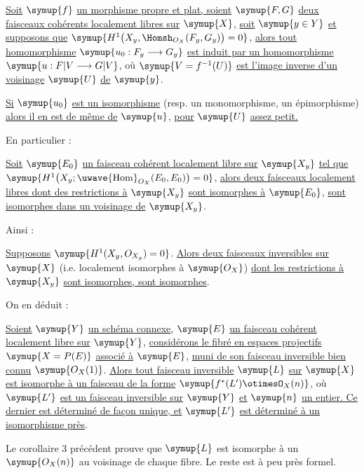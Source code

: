  \uline{Soit} $\symup{f}$ \uline{un morphisme propre et plat, soient} $\symup{F,G}$ \uline{deux
faisceaux cohérents localement libres sur} $\symup{X}$, \uline{soit} $\symup{y\in Y}$ \uline{et supposons que}
$\symup{H^1\bigl(X_y,\Homsh_{O_X}(F_y,G_y)\bigr)=0}$,
\uline{alors tout homomorphisme} $\symup{u_0:F_y\longrightarrow G_y}$ \uline{est induit par un
homomorphisme} $\symup{u:F|V\longrightarrow G|V}$, où $\symup{V=f^{-1}(U)}$ \uline{est l'image inverse d'un voisinage} $\symup{U}$ \uline{de} $\symup{y}$.

 \uline{Si} $\symup{u_0}$ \uline{est un isomorphisme} (resp. un monomorphisme, un
épimorphisme) \uline{alors il en est de même de} $\symup{u}$, \uline{pour} $\symup{U}$ \uline{assez petit.}

En particulier :

 \uline{Soit} $\symup{E_0}$ \uline{un faisceau cohérent localement libre sur}
$\symup{X_y}$ \uline{tel que}
$\symup{H^1\bigl(X_y;\mathop{\text{\uwave{Hom}}}\nolimits_{O_X}(E_0,E_0)\bigr)=0}$,
\uline{alors deux faisceaux localement libres dont des restrictions à} $\symup{X_y}$ \uline{sont
isomorphes à} $\symup{E_0}$, \uline{sont isomorphes dans un voisinage de} $\symup{X_y}$.

Ainsi :

 \uline{Supposons} $\symup{H^1(X_y,O_{X_y})=0}$. \uline{Alors deux faisceaux
inversibles sur} $\symup{X}$ (i.e. localement isomorphes à $\symup{O_X}$) \uline{dont les
restrictions à} $\symup{X_y}$ \uline{sont isomorphes, sont isomorphes}.

On en déduit :

 \uline{Soient} $\symup{Y}$ \uline{un schéma connexe}, $\symup{E}$ \uline{un faisceau cohérent localement libre sur} $\symup{Y}$, \uline{considérons le fibré en espaces projectifs}
$\symup{X=P(E)}$ \uline{associé à} $\symup{E}$, \uline{muni de son faisceau inversible bien connu}
$\symup{O_X(1)}$. \uline{Alors tout faisceau inversible} $\symup{L}$ \uline{sur} $\symup{X}$ \uline{est isomorphe à un
faisceau de la forme}
$\symup{f^*(L')\otimesO_X(n)}$,
où $\symup{L'}$ \uline{est un faisceau inversible sur} $\symup{Y}$ \uline{et} $\symup{n}$ \uline{un entier. Ce dernier est
déterminé de façon unique, et} $\symup{L'}$ \uline{est déterminé à un isomorphisme près}.

Le corollaire 3 précédent prouve que $\symup{L}$ est isomorphe à un $\symup{O_X(n)}$ au
voisinage de chaque fibre. Le reste est à peu près formel.

